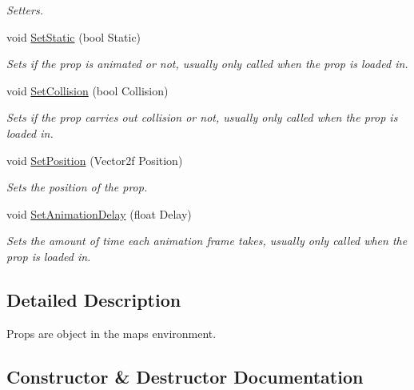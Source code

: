 \begin{DoxyCompactItemize}
\begin{DoxyCompactList}\small\item\em Setters. \end{DoxyCompactList}\item 
void \hyperlink{class_prop_a5f94f90ac04f9b1469dd79c16ca9cd1e}{Set\+Static} (bool Static)
\begin{DoxyCompactList}\small\item\em Sets if the prop is animated or not, usually only called when the prop is loaded in. \end{DoxyCompactList}\item 
void \hyperlink{class_prop_af3ed9a53c617166e29a655d39a884999}{Set\+Collision} (bool Collision)
\begin{DoxyCompactList}\small\item\em Sets if the prop carries out collision or not, usually only called when the prop is loaded in. \end{DoxyCompactList}\item 
void \hyperlink{class_prop_abb90ef176de5d431de4714d94bfa3bf2}{Set\+Position} (Vector2f Position)
\begin{DoxyCompactList}\small\item\em Sets the position of the prop. \end{DoxyCompactList}\item 
void \hyperlink{class_prop_a7577e928046cad8d2217f1c68370d8cb}{Set\+Animation\+Delay} (float Delay)
\begin{DoxyCompactList}\small\item\em Sets the amount of time each animation frame takes, usually only called when the prop is loaded in. \end{DoxyCompactList}\end{DoxyCompactItemize}


\subsection{Detailed Description}
Props are object in the maps environment. 



\subsection{Constructor \& Destructor Documentation}
\mbox{\label{class_prop_a1e207bb51ed3d92ec2c93d45dfcbcabf}} 
